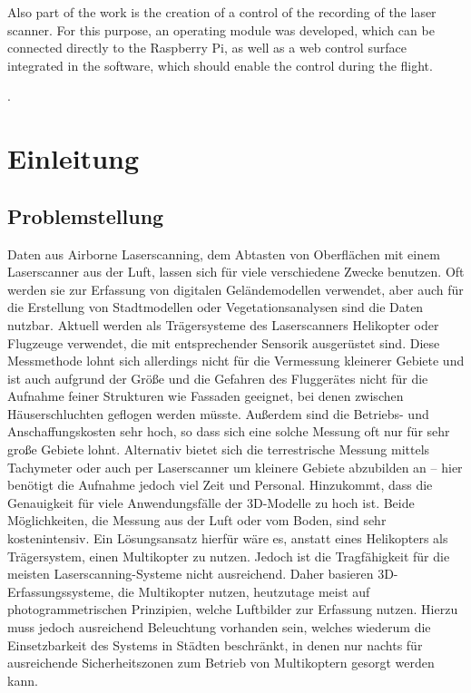\documentclass[a4paper,12pt,bibliography=totoc, listof=totoc,titlepage,pointlessnumbers]{scrreprt}
\begin{document}
Also part of the work is the creation of a control of the recording of the laser scanner. For this purpose, an operating module was developed, which can be connected directly to the Raspberry Pi, as well as a web control surface integrated in the software, which should enable the control during the flight.


\providecommand{\citeTwo}[4]{\citep[{\citealp[#1]{#2};}][#3]{#4}} 
\providecommand{\citeThree}[6]{\citep[{\citealp[#1]{#2}; \citealp[#3]{#4};}][#5]{#6}} 
\providecommand{\citeFour}[8]{\citep[{\citealp[#1]{#2}; \citealp[#3]{#4}; \citealp[#5]{#6};}][#7]{#8}}.

\newpage

\tableofcontents
\newpage

\setcounter{page}{1} 

\chapter{Einleitung}

\section{Problemstellung}
Daten aus Airborne Laserscanning, dem Abtasten von Oberflächen mit einem Laser\-scan\-ner aus der Luft, lassen sich für viele verschiedene Zwecke benutzen. Oft werden sie zur Erfassung von digitalen Geländemodellen verwendet, aber auch für die Erstellung von Stadtmodellen oder Vegetationsanalysen sind die Daten nutzbar. Aktuell werden als Trägersysteme des Laser\-scan\-ners Helikopter oder Flugzeuge verwendet, die mit entsprechender Sensorik ausgerüstet sind. Diese Messmethode lohnt sich allerdings nicht für die Vermessung kleinerer Gebiete und ist auch aufgrund der Größe und die Gefahren des Fluggerätes nicht für die Aufnahme feiner Strukturen wie Fassaden geeignet, bei denen zwischen Häuserschluchten geflogen werden müsste. Außerdem sind die Betriebs- und Anschaffungskosten sehr hoch, so dass sich eine solche Messung oft nur für sehr große Gebiete lohnt. Alternativ bietet sich die terrestrische Messung mittels Tachymeter oder auch per Laser\-scan\-ner um kleinere Gebiete abzubilden an -- hier benötigt die Aufnahme jedoch viel Zeit und Personal. Hinzukommt, dass die Genauigkeit für viele Anwendungsfälle der 3D-Modelle zu hoch ist. Beide Möglichkeiten, die Messung aus der Luft oder vom Boden, sind sehr kostenintensiv. Ein Lösungsansatz hierfür wäre es, anstatt eines Helikopters als Trägersystem, einen Multikopter zu nutzen. Jedoch ist die Tragfähigkeit für die meisten Laserscanning-Systeme nicht ausreichend. Daher basieren 3D-Erfassungssysteme, die Multikopter nutzen, heutzutage meist auf photogrammetrischen Prinzipien, welche Luftbilder zur Erfassung nutzen. Hierzu muss jedoch ausreichend Beleuchtung vorhanden sein, welches wiederum die Einsetzbarkeit des Systems in Städten beschränkt, in denen nur nachts für ausreichende Sicherheitszonen zum Betrieb von Multikoptern gesorgt werden kann. 
\end{document}
